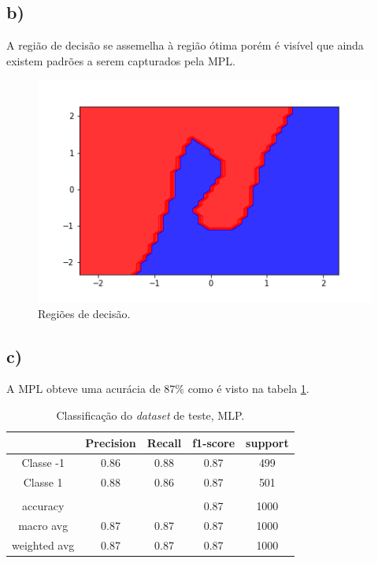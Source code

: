\documentclass{article}
\begin{document}
    \subsection*{b)}
    A região de decisão se assemelha à região ótima porém é visível que ainda existem padrões
    a serem capturados pela MPL.
    \begin{figure}[H]
        \centering
        \includegraphics[width=\linewidth]{mpl_decision.png}   
        \caption{Regiões de decisão.}
        \label{fig:mpl_decision}
    \end{figure}

    \subsection*{c)}
    A MPL obteve uma acurácia de $87\%$ como é visto na tabela \ref{tbl:mpl_test}.
    \begin{table}[H]
        \begin{tabular}{c|c|c|c|c|}
        \cline{2-5}
                                        & \textbf{Precision} & \textbf{Recall} & \textbf{f1-score} & \textbf{support} \\ \hline
        \multicolumn{1}{|c|}{Classe -1}    & 0.86               & 0.88            & 0.87              & 499              \\ \hline
        \multicolumn{1}{|c|}{Classe 1}     & 0.88               & 0.86            & 0.87              & 501              \\ \hline
        \multicolumn{1}{|c|}{}             &                    &                 &                   &                  \\ \hline
        \multicolumn{1}{|c|}{accuracy}     &                    &                 & 0.87              & 1000             \\ \hline
        \multicolumn{1}{|c|}{macro avg}    & 0.87               & 0.87            & 0.87              & 1000             \\ \hline
        \multicolumn{1}{|c|}{weighted avg} & 0.87               & 0.87            & 0.87              & 1000             \\ \hline
        \end{tabular}
        \caption{Classificação do \textit{dataset} de teste, MLP.}
        \label{tbl:mpl_test}
    \end{table}
\end{document}
